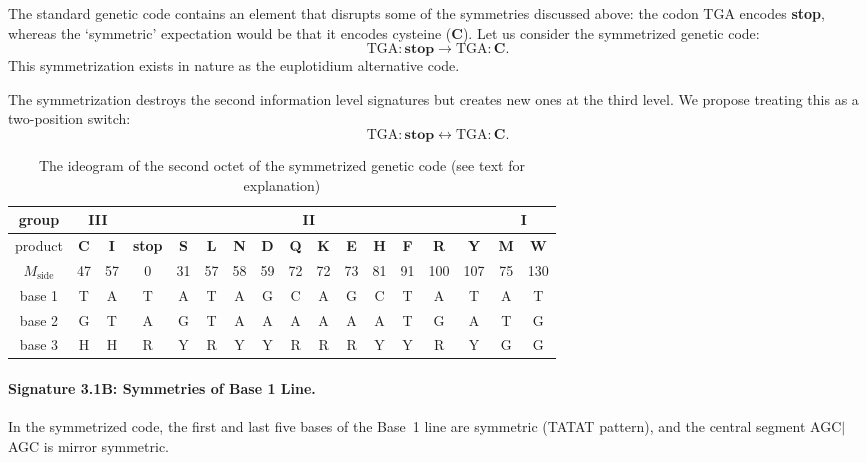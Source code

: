 \documentclass[12pt]{article}
\begin{document}
The standard genetic code contains an element that disrupts some of the symmetries discussed above: the codon TGA encodes \textbf{stop}, whereas the `symmetric' expectation would be that it encodes cysteine (\textbf{C}). Let us consider the symmetrized genetic code:
\begin{equation}
\text{TGA} : \textbf{stop} \to \text{TGA} : \textbf{C}.
\end{equation}
This symmetrization exists in nature as the euplotidium alternative code.

The symmetrization destroys the second information level signatures but creates new ones at the third level. We propose treating this as a two-position switch:
\begin{equation}
\text{TGA} : \textbf{stop} \leftrightarrow \text{TGA} : \textbf{C}.
\end{equation}

\begin{table}[htbp]
\centering
\caption{The ideogram of the second octet of the symmetrized genetic code (see text for explanation)}
\label{tab:ideogram_symm}
\footnotesize
\begin{tabular}{|c|c|c|c|c|c|c|c|c|c|c|c|c|c|c|c|c|}
\hline
group & \multicolumn{2}{c|}{\textbf{III}} & \multicolumn{12}{c|}{\textbf{II}} & \multicolumn{2}{c|}{\textbf{I}} \\
\hline
product & \textbf{C} & \textbf{I} & \textbf{stop} & \textbf{S} & \textbf{L} & \textbf{N} & \textbf{D} & \textbf{Q} & \textbf{K} & \textbf{E} & \textbf{H} & \textbf{F} & \textbf{R} & \textbf{Y} & \textbf{M} & \textbf{W} \\
$M_{\text{side}}$ & 47 & 57 & 0 & 31 & 57 & 58 & 59 & 72 & 72 & 73 & 81 & 91 & 100 & 107 & 75 & 130 \\
\hline
base 1 & T & A & T & A & T & A & G & C & A & G & C & T & A & T & A & T \\
base 2 & G & T & A & G & T & A & A & A & A & A & A & T & G & A & T & G \\
base 3 & H & H & R & Y & R & Y & Y & R & R & R & Y & Y & R & Y & G & G \\
\hline
\end{tabular}
\end{table}

\paragraph{Signature 3.1B: Symmetries of Base 1 Line.} In the symmetrized code, the first and last five bases of the Base~1 line are symmetric (TATAT pattern), and the central segment AGC$|$AGC is mirror symmetric.
\end{document}
